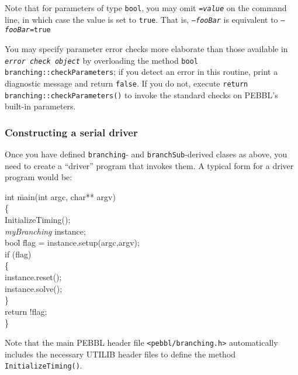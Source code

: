 Note that for parameters of type \texttt{bool}, you may omit
\texttt{=\emph{value}} on the command line, in which case the value is
set to \texttt{true}.  That is, \texttt{--\emph{fooBar}} is
equivalent to \texttt{--\emph{fooBar}=true}

You may specify parameter error checks more elaborate than those
available in \texttt{\emph{error check object}} by overloading the
method \texttt{bool branching::checkParameters}; if you detect an
error in this routine, print a diagnostic message and return
\texttt{false}.  If you do not, execute \texttt{return
branching::checkParameters()} to invoke the standard checks on PEBBL's
built-in parameters.

%
%
%


\subsubsection{Constructing a serial driver}

Once you have defined \texttt{branching}- and
\texttt{branchSub}-derived clases as above, you need to create a
``driver'' program that invokes them.  A typical form for a driver
program would be:

\begin{codeblock}
int \=main(int argc, char** argv)\\
\{\\
\>  InitializeTiming(); \\
\>  \emph{myBranching} instance; \\
\>  boo\=l f\=lag = instance.setup(argc,argv); \\
\>  if (flag) \\
\>\>    \{ \\
\>\>\>      instance.reset(); \\
\>\>\>      instance.solve(); \\
\>\>    \}\\
\>  return !flag; \\
\}
\end{codeblock}
Note that the main PEBBL header file \texttt{<pebbl/branching.h>}
automatically includes the necessary UTILIB header files to define the
method \texttt{InitializeTiming()}.

